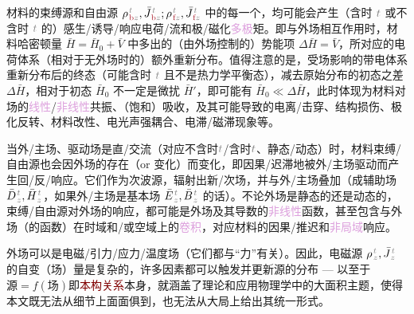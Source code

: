 材料的束缚源和自由源 ${\rho}^{\;\!\mathcolor{gray}{t}}_{\;\!\textcolor{Maroon}{\text{b}}\mathcolor{gray}{z}}, \bar{J}^{\;\!\mathcolor{gray}{t}}_{\;\!\textcolor{Maroon}{\text{b}}\mathcolor{gray}{z}};{\rho}^{\;\!\mathcolor{gray}{t}}_{\;\!\textcolor{Maroon}{\text{f}}\mathcolor{gray}{z}}, \bar{J}^{\;\!\mathcolor{gray}{t}}_{\;\!\textcolor{Maroon}{\text{f}}\mathcolor{gray}{z}}$ 中的每一个，均可能会产生（含时 $\mathcolor{gray}{t}$ 或不含时 $\mathcolor{gray}{t}$ 的）感生/诱导/响应电荷/流\cite{markelExternalInducedFree2018,raabMultipoleTheoryElectromagnetism2004,tsukermanPolarizationArbitraryCharge2021a}和极/磁化\textcolor{Plum}{多极}矩。即与外场相互作用时，材料\textcolor{NavyBlue}{哈密顿量} $\bar{H} = \bar{H}_0 + \bar{V}$ 中多出的（由外场控制的）势能项 $\Delta \bar{H} = \bar{V}$\cite{boydNonlinearOptics2019,raabMultipoleTheoryElectromagnetism2004}，所对应的电荷体系（相对于无外场时的）额外重新分布。值得注意的是，受场影响的带电体系重新分布后的终态（可能含时 $\mathcolor{gray}{t}$ 且不是热力学平衡态），减去原始分布的初态之差 $\Delta \bar{H}$，相对于初态 $\bar{H}_0$ 不一定是\textcolor{NavyBlue}{微扰} $\bar{H}'$\cite{boydNonlinearOptics2019}，即可能有 $\bar{H}_0 \ll \Delta \bar{H}$，此时体现为材料对场的\textcolor{Plum}{线性}/\textcolor{Plum}{非线性}\textcolor{NavyBlue}{共振}、（饱和）\textcolor{NavyBlue}{吸收}，及其可能导致的电离/击穿\cite{boydNonlinearOptics2019}、结构损伤、极化反转、材料改性\cite{xuFemtosecondLaserWriting2022,weiExperimentalDemonstrationThreedimensional2018,xuThreedimensionalNonlinearPhotonic2018,keren-zurNewDimensionNonlinear2018}、电光声强耦合、电滞/磁滞现象等。

当外/主场、驱动场是直/交流（对应不含时$\mathcolor{gray}{t}$/含时$\mathcolor{gray}{t}$、静态/动态）时，材料束缚/自由源也会因外场的存在（or 变化）而变化，即因果/迟滞地被外/主场驱动而产生回/反/响应。它们作为次\textcolor{NavyBlue}{波源}，辐射出新/次场，并与外/主场叠加（成\textcolor{NavyBlue}{辅助场} $\bar{D}^{\;\!\mathcolor{gray}{t}}_{\;\!\mathcolor{gray}{z}}, \bar{H}^{\;\!\mathcolor{gray}{t}}_{\;\!\mathcolor{gray}{z}}$，如果外/主场是\textcolor{NavyBlue}{基本场} $\bar{E}^{\;\!\mathcolor{gray}{t}}_{\;\!\mathcolor{gray}{z}}, \bar{B}^{\;\!\mathcolor{gray}{t}}_{\;\!\mathcolor{gray}{z}}$ 的话）。不论外场是静态的还是动态的，束缚/自由源对外场的响应，都可能是外场及其导数的\textcolor{Plum}{非线性}函数，甚至包含与外场（的函数）在时域和/或空域上的\textcolor{Plum}{卷积}，对应材料的因果/推迟和\textcolor{Plum}{非局域}响应。

外场可以是电磁/引力/应力/温度场（它们都与“力”有关）。因此，电磁源 ${\rho}^{\;\!\mathcolor{gray}{t}}_{\;\!\mathcolor{gray}{z}}, \bar{J}^{\;\!\mathcolor{gray}{t}}_{\;\!\mathcolor{gray}{z}}$ 的自变（场）量是复杂的，许多因素都可以触发并更新源的分布 --- 以至于$\text{源} = f(\text{场})$即\textcolor{Maroon}{本构关系}本身，就涵盖了理论和应用物理学中的大面积主题，使得本文既无法从细节上面面俱到，也无法从大局上给出其统一形式。

